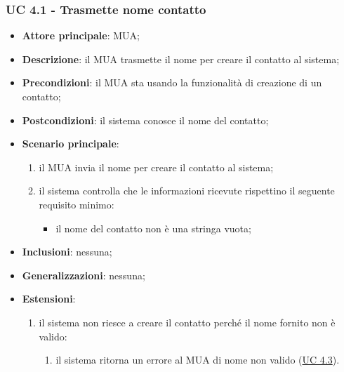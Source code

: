 \subsubsection{UC 4.1 - Trasmette nome contatto} \label{sec:UC4.1}
    \begin{itemize}
        \item \textbf{Attore principale}: MUA;
        \item \textbf{Descrizione}: il MUA trasmette il nome per creare il contatto al sistema;
        \item \textbf{Precondizioni}: il MUA sta usando la funzionalità di creazione di un contatto;
        \item \textbf{Postcondizioni}: il sistema conosce il nome del contatto;
        \item \textbf{Scenario principale}:
            \begin{enumerate}
                \item il MUA invia il nome per creare il contatto al sistema;
                \item il sistema controlla che le informazioni ricevute rispettino il seguente requisito minimo:
                    \begin{itemize}
                        \item il nome del contatto non è una stringa vuota;
                    \end{itemize}
            \end{enumerate}
        \item \textbf{Inclusioni}: nessuna;
        \item \textbf{Generalizzazioni}: nessuna;
        \item \textbf{Estensioni}:
            \begin{enumerate}[label=\alph*.]
                \item il sistema non riesce a creare il contatto perché il nome fornito non è valido:
                \begin{enumerate}[label=\arabic*.]
                    \item il sistema ritorna un errore al MUA di nome non valido (\hyperref[sec:UC4.3]{UC 4.3}).
                \end{enumerate}
            \end{enumerate}
    \end{itemize}


